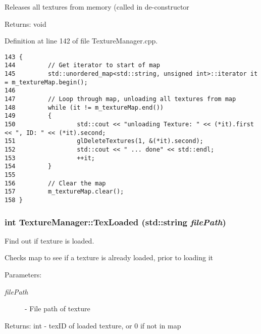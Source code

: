 Releases all textures from memory (called in de-constructor

\begin{Desc}
\item[Returns:]void \end{Desc}


Definition at line 142 of file TextureManager.cpp.

\begin{Code}\begin{verbatim}143 {
144         // Get iterator to start of map
145         std::unordered_map<std::string, unsigned int>::iterator it = m_textureMap.begin();
146 
147         // Loop through map, unloading all textures from map
148         while (it != m_textureMap.end())
149         {
150                 std::cout << "unloading Texture: " << (*it).first << ", ID: " << (*it).second;
151                 glDeleteTextures(1, &(*it).second);
152                 std::cout << " ... done" << std::endl;
153                 ++it;
154         }
155 
156         // Clear the map
157         m_textureMap.clear();
158 }
\end{verbatim}
\end{Code}


\hypertarget{class_texture_manager_d8ff7cb104088eaa2099f59f179aa92e}{
\subsubsection[TexLoaded]{\setlength{\rightskip}{0pt plus 5cm}int TextureManager::TexLoaded (std::string {\em filePath})}}
\label{class_texture_manager_d8ff7cb104088eaa2099f59f179aa92e}


Find out if texture is loaded. 

Checks map to see if a texture is already loaded, prior to loading it

\begin{Desc}
\item[Parameters:]
\begin{description}
\item[{\em filePath}]- File path of texture\end{description}
\end{Desc}
\begin{Desc}
\item[Returns:]int - texID of loaded texture, or 0 if not in map \end{Desc}


